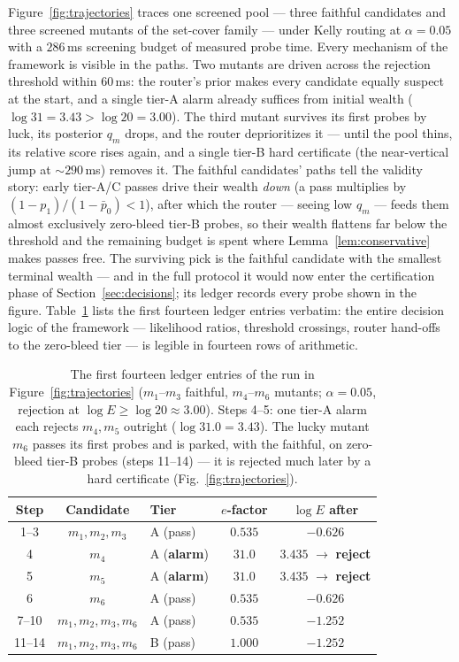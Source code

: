 \documentclass[pdflatex,sn-mathphys-num]{sn-jnl}
\theoremstyle{thmstyleone}
\theoremstyle{thmstyletwo}
\newcommand{\Eproc}{E}
\begin{document}
Figure~\ref{fig:trajectories} traces one screened pool --- three
faithful candidates and three screened mutants of the set-cover
family --- under Kelly routing at $\alpha = 0.05$ with a $286$\,ms
screening budget of measured probe time. Every mechanism of the framework is
visible in the paths. Two mutants are driven across the rejection
threshold within $60$\,ms: the router's prior makes every candidate
equally suspect at the start, and a single tier-A alarm already
suffices from initial wealth
($\log 31 = 3.43 > \log 20 = 3.00$). The third
mutant survives its first probes by luck, its posterior $q_m$ drops,
and the router deprioritizes it --- until the pool thins, its
relative score rises again, and a single tier-B hard certificate
(the near-vertical jump at ${\sim}290$\,ms) removes it. The faithful
candidates' paths tell the validity story: early tier-A/C passes
drive their wealth \emph{down} (a pass multiplies by
$(1-p_1)/(1-\bar p_0) < 1$), after which the router --- seeing low
$q_m$ --- feeds them almost exclusively zero-bleed tier-B probes, so
their wealth flattens far below the threshold and the remaining
budget is spent where Lemma~\ref{lem:conservative} makes passes free.
The surviving pick is the faithful candidate with the smallest
terminal wealth --- and in the full protocol it would now enter the
certification phase of Section~\ref{sec:decisions}; its ledger
records every probe shown in the figure.
Table~\ref{tab:trace} lists the first fourteen ledger entries
verbatim: the entire decision logic of the framework --- likelihood
ratios, threshold crossings, router hand-offs to the zero-bleed tier
--- is legible in fourteen rows of arithmetic.

\begin{table}[t]
\caption{The first fourteen ledger entries of the run in
Figure~\ref{fig:trajectories} ($m_1$--$m_3$ faithful, $m_4$--$m_6$
mutants; $\alpha = 0.05$, rejection at
$\log \Eproc \ge \log 20 \approx 3.00$). Steps 4--5: one tier-A alarm
each rejects $m_4, m_5$ outright ($\log 31.0 = 3.43$). The lucky
mutant $m_6$ passes its first probes and is parked, with the
faithful, on zero-bleed tier-B probes (steps 11--14) --- it is
rejected much later by a hard certificate (Fig.~\ref{fig:trajectories}).}
\label{tab:trace}
\begin{tabular}{cclcc}
\toprule
Step & Candidate & Tier & $e$-factor & $\log \Eproc$ after\\
\midrule
1--3 & $m_1, m_2, m_3$ & A (pass) & $0.535$ & $-0.626$\\
4 & $m_4$ & A (\textbf{alarm}) & $31.0$ & $3.435$ $\to$ \textbf{reject}\\
5 & $m_5$ & A (\textbf{alarm}) & $31.0$ & $3.435$ $\to$ \textbf{reject}\\
6 & $m_6$ & A (pass) & $0.535$ & $-0.626$\\
7--10 & $m_1, m_2, m_3, m_6$ & A (pass) & $0.535$ & $-1.252$\\
11--14 & $m_1, m_2, m_3, m_6$ & B (pass) & $1.000$ & $-1.252$\\
\bottomrule
\end{tabular}
\end{table}
\end{document}
